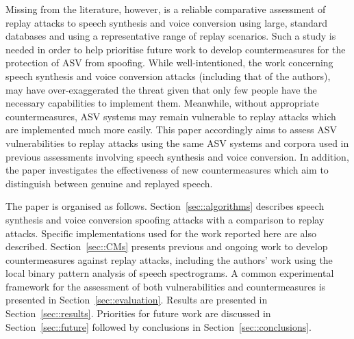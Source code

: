 
Missing from the literature, however, is a reliable comparative assessment 
of replay attacks to speech synthesis and voice conversion using large, 
standard databases and using a representative range of replay scenarios. 
Such a study is needed in order to help prioritise future work to develop
countermeasures for the protection of ASV from spoofing.
While well-intentioned, the work concerning speech synthesis and voice conversion attacks 
(including that of the authors), may have over-exaggerated the threat given that
only few people have the necessary capabilities to implement them.  Meanwhile, 
without appropriate countermeasures, ASV systems may remain vulnerable to replay 
attacks which are implemented much more easily.
This paper accordingly aims to assess ASV vulnerabilities 
to replay attacks using the same ASV systems and corpora used in 
previous assessments involving speech synthesis and voice conversion.  In addition, the paper investigates the effectiveness of 
new countermeasures which aim to distinguish between genuine and replayed speech.  

The paper is organised as follows.  Section~\ref{sec::algorithms} describes speech synthesis and voice conversion spoofing attacks with a comparison to replay attacks. Specific implementations used for the work reported here are also described. Section~\ref{sec::CMs} presents previous and ongoing work to develop countermeasures against replay attacks, including the authors' work using the local binary pattern analysis of speech spectrograms.  A common experimental framework for the assessment of both vulnerabilities and countermeasures is presented in Section~\ref{sec::evaluation}. Results are presented in Section~\ref{sec::results}.  Priorities for future work are discussed in Section~\ref{sec::future} followed by conclusions in Section~\ref{sec::conclusions}.
